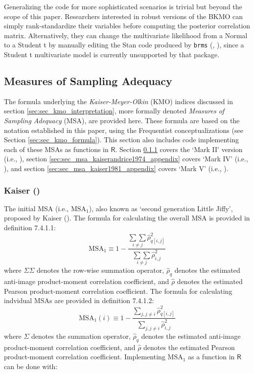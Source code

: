 \documentclass[
  10pt,
  a4paper,
  twoside]{article}
\begin{document}
Generalizing the code for more sophisticated scenarios is trivial but beyond the scope of this paper. Researchers interested in robust versions of the BKMO can simply rank-standardize their variables before computing the posterior correlation matrix. Alternatively, they can change the multivariate likelihood from a Normal to a Student t by manually editing the Stan code produced by \texttt{brms} (, ), since a Student t multivariate model is currently unsupported by that package.

\subsection{Measures of Sampling Adequacy}\label{sec:sec_msa_appendix}

The formula underlying the \emph{Kaiser-Meyer-Olkin} (KMO) indices discussed in section \ref{sec:sec_kmo_interpretation}, more formally denoted \emph{Measures of Sampling Adequacy} (MSA), are provided here. These formula are based on the notation established in this paper, using the Frequentist conceptualizations (see Section \ref{sec:sec_kmo_formula}). This section also includes code implementing each of these MSAs as functions in \(\textsf{R}\). Section \ref{sec:sec_msa_kaiser1970_appendix} covers the `Mark II' version (i.e., ), section \ref{sec:sec_msa_kaiserandrice1974_appendix} covers `Mark IV' (i.e., ), and section \ref{sec:sec_msa_kaiser1981_appendix} covers `Mark V' (i.e., ).

\subsubsection{\texorpdfstring{Kaiser ()}{Kaiser (1970)}}\label{sec:sec_msa_kaiser1970_appendix}

The initial MSA (i.e., \(\text{MSA}_1\)), also known as `second generation Little Jiffy', proposed by Kaiser (). The formula for calculating the overall MSA is provided in definition 7.4.1.1:
\[
\text{MSA}_1 \equiv 1 - \frac{\underset{i \neq j}{\sum \sum} \hat{\rho}^2_{q[i,j]}}{\underset{i \neq j}{\sum \sum} \hat{\rho}^2_{i,j}} \tag{7.4.1.1}
\]
where \(\Sigma \Sigma\) denotes the row-wise summation operator, \(\hat{\rho}_{q}\) denotes the estimated anti-image product-moment correlation coefficient, and \(\hat{\rho}\) denotes the estimated Pearson product-moment correlation coefficient. The formula for calculating indvidual MSAs are provided in definition 7.4.1.2:
\[
\text{MSA}_1(i) \equiv 1 - \frac{
\sum_{j, j \neq i} \hat{\rho}^2_{q[i,j]}
}{
\sum_{j, j \neq i} \hat{\rho}^2_{i,j}
}  \tag{7.4.1.2}
\]
where \(\Sigma\) denotes the summation operator, \(\hat{\rho}_{q}\) denotes the estimated anti-image product-moment correlation coefficient, and \(\hat{\rho}\) denotes the estimated Pearson product-moment correlation coefficient. Implementing \(\text{MSA}_1\) as a function in \(\textsf{R}\) can be done with:
\end{document}
